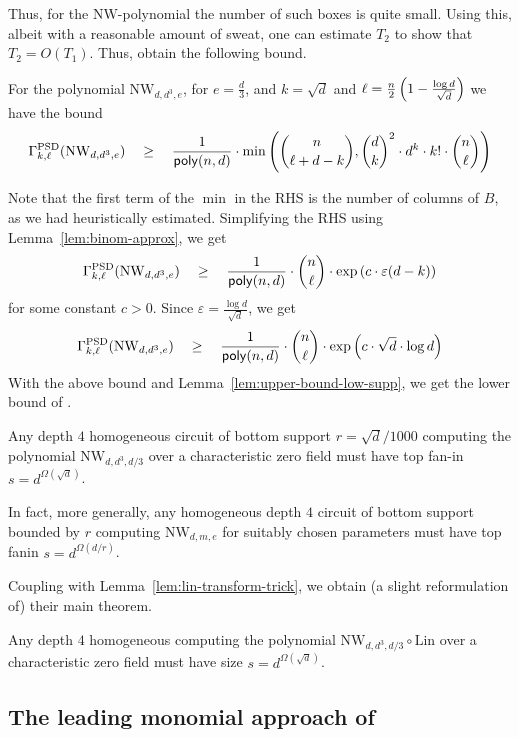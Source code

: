 \documentclass[12pt]{report}
\newcommand{\NW}{\mathrm{NW}}
\newcommand{\poly}{\mathsf{poly}}
\renewcommand{\epsilon}{\varepsilon}
\begin{document}
Thus, for the $\NW$-polynomial the number of such boxes is quite small. Using this, albeit with a reasonable amount of sweat, one can estimate $T_2$ to show that $T_2 = O(T_1)$. Thus, \cite{KLSS} obtain the following bound. 

\begin{lemma}
For the polynomial $\NW_{d,d^3,e}$, for $e = \frac{d}{3}$, and $k = \sqrt{d}$ and $\ell = \frac{n}{2}\left(1 - \frac{\log d}{\sqrt{d}}\right)$ we have the bound
\[
\Gamma^{\mathrm{PSD}}_{k,\ell}(\NW_{d,d^3,e}) \spaced{\geq} \frac{1}{\poly(n,d)} \cdot \min\inparen{\binom{n}{\ell + d - k}, \binom{d}{k}^2 \cdot d^k \cdot k! \cdot \binom{n}{\ell}}
\]
\end{lemma}
Note that the first term of the $\min$ in the RHS is the number of columns of $B$, as we had heuristically estimated. Simplifying the RHS using Lemma~\ref{lem:binom-approx}, we get
\[
\Gamma^{\mathrm{PSD}}_{k,\ell}(\NW_{d,d^3,e}) \spaced{\geq} \frac{1}{\poly(n,d)} \cdot \binom{n}{\ell}\cdot \exp\inparen{c\cdot \epsilon (d - k)}
\]
for some constant $c > 0$. Since $\epsilon = \frac{\log d}{\sqrt{d}}$, we get 
\[
\Gamma^{\mathrm{PSD}}_{k,\ell}(\NW_{d,d^3,e}) \spaced{\geq} \frac{1}{\poly(n,d)} \cdot \binom{n}{\ell}\cdot \exp\inparen{c\cdot \sqrt{d}\cdot \log d}
\]
With the above bound and Lemma~\ref{lem:upper-bound-low-supp}, we get the lower bound of \cite{KLSS}. 
\begin{theorem}\label{thm:KLSS-lowsupp}
Any depth $4$ homogeneous circuit of bottom support $r = \sqrt{d}/1000$ computing the polynomial $\NW_{d,d^3,d/3}$ over a characteristic zero field must have top fan-in $s = d^{\Omega(\sqrt{d})}$. 

In fact, more generally, any homogeneous depth $4$ circuit of bottom support bounded by $r$ computing $\NW_{d,m,e}$ for suitably chosen parameters must have top fanin $s = d^{\Omega(d/r)}$. 
\end{theorem}

Coupling with Lemma~\ref{lem:lin-transform-trick}, we obtain (a slight reformulation of) their main theorem. 

\begin{theorem}\label{thm:KLSS-main}
Any depth $4$ homogeneous computing the polynomial $\NW_{d,d^3,d/3}\circ \mathrm{Lin}$ over a characteristic zero field must have size $s = d^{\Omega(\sqrt{d})}$. 
\end{theorem}

\subsection{The leading monomial approach of \cite{KS14}}
\end{document}
